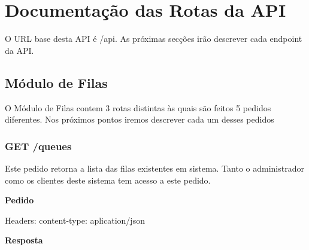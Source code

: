 \documentclass[12pt,a4paper]{article}
\begin{document}
\pagebreak
\appendix
\section{Documentação das Rotas da API}
O URL base desta API é /api. As próximas secções irão descrever cada endpoint da API.

\subsection{Módulo de Filas}
O Módulo de Filas contem 3 rotas distintas às quais são feitos 5 pedidos diferentes. Nos próximos pontos 
iremos descrever cada um desses pedidos
\subsubsection{GET /queues}
Este pedido retorna a lista das filas existentes em sistema. Tanto o administrador como os clientes deste sistema tem acesso a este pedido.\par
\vspace{0.5 cm}
 \textbf{Pedido}\par
Headers: content-type: aplication/json\par
\vspace{0.5 cm}
\textbf{Resposta}\par
\end{document}
